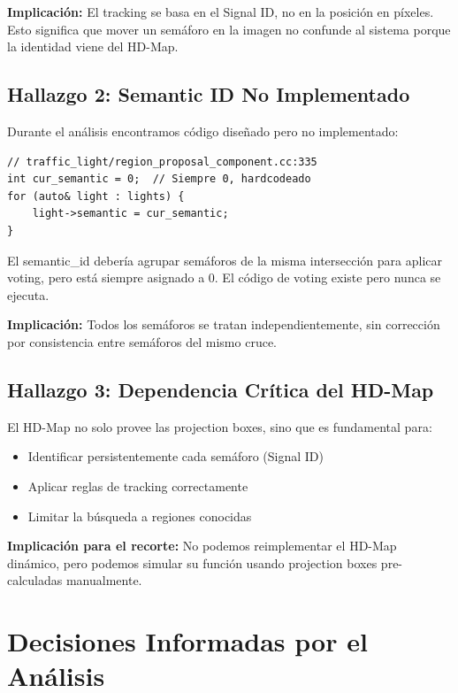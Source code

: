 \textbf{Implicación:} El tracking se basa en el Signal ID, no en la posición en píxeles. Esto significa que mover un semáforo en la imagen no confunde al sistema porque la identidad viene del HD-Map.

\subsection{Hallazgo 2: Semantic ID No Implementado}

Durante el análisis encontramos código diseñado pero no implementado:

\begin{codesnippet}
\begin{verbatim}
// traffic_light/region_proposal_component.cc:335
int cur_semantic = 0;  // Siempre 0, hardcodeado
for (auto& light : lights) {
    light->semantic = cur_semantic;
}
\end{verbatim}
\end{codesnippet}

El semantic\_id debería agrupar semáforos de la misma intersección para aplicar voting, pero está siempre asignado a 0. El código de voting existe pero nunca se ejecuta.

\textbf{Implicación:} Todos los semáforos se tratan independientemente, sin corrección por consistencia entre semáforos del mismo cruce.

\subsection{Hallazgo 3: Dependencia Crítica del HD-Map}

El HD-Map no solo provee las projection boxes, sino que es fundamental para:

\begin{itemize}
    \item Identificar persistentemente cada semáforo (Signal ID)
    \item Aplicar reglas de tracking correctamente
    \item Limitar la búsqueda a regiones conocidas
\end{itemize}

\textbf{Implicación para el recorte:} No podemos reimplementar el HD-Map dinámico, pero podemos simular su función usando projection boxes pre-calculadas manualmente.

\section{Decisiones Informadas por el Análisis}

